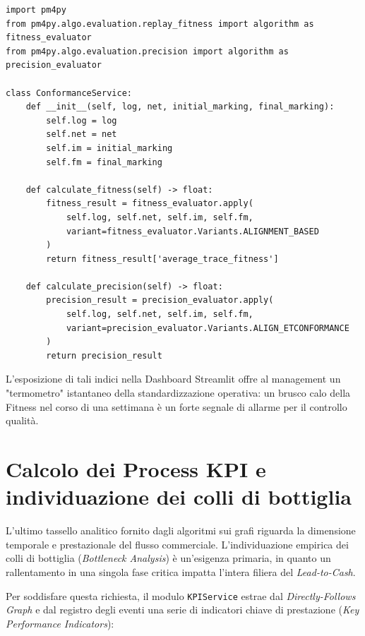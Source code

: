 \documentclass[12pt, a4paper]{report}
\begin{document}
\begin{verbatim}
import pm4py
from pm4py.algo.evaluation.replay_fitness import algorithm as fitness_evaluator
from pm4py.algo.evaluation.precision import algorithm as precision_evaluator

class ConformanceService:
    def __init__(self, log, net, initial_marking, final_marking):
        self.log = log
        self.net = net
        self.im = initial_marking
        self.fm = final_marking

    def calculate_fitness(self) -> float:
        fitness_result = fitness_evaluator.apply(
            self.log, self.net, self.im, self.fm,
            variant=fitness_evaluator.Variants.ALIGNMENT_BASED
        )
        return fitness_result['average_trace_fitness']

    def calculate_precision(self) -> float:
        precision_result = precision_evaluator.apply(
            self.log, self.net, self.im, self.fm,
            variant=precision_evaluator.Variants.ALIGN_ETCONFORMANCE
        )
        return precision_result
\end{verbatim}

L'esposizione di tali indici nella Dashboard Streamlit offre al management un "termometro" istantaneo della standardizzazione operativa: un brusco calo della Fitness nel corso di una settimana è un forte segnale di allarme per il controllo qualità.

\section{Calcolo dei Process KPI e individuazione dei colli di bottiglia}
L'ultimo tassello analitico fornito dagli algoritmi sui grafi riguarda la dimensione temporale e prestazionale del flusso commerciale. L'individuazione empirica dei colli di bottiglia (\textit{Bottleneck Analysis}) è un'esigenza primaria, in quanto un rallentamento in una singola fase critica impatta l'intera filiera del \textit{Lead-to-Cash}.

Per soddisfare questa richiesta, il modulo \texttt{KPIService} estrae dal \textit{Directly-Follows Graph} e dal registro degli eventi una serie di indicatori chiave di prestazione (\textit{Key Performance Indicators}):
\end{document}
